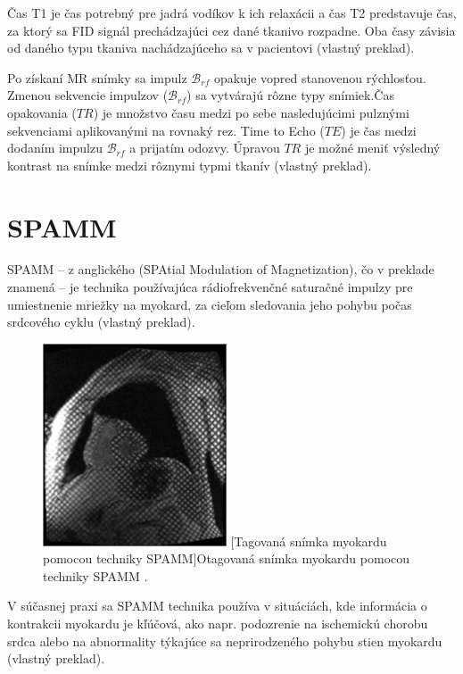 Čas T1 je čas potrebný pre jadrá vodíkov k ich relaxácii a čas T2 predstavuje čas, za ktorý sa FID signál prechádzajúci cez dané tkanivo rozpadne. \newline Oba časy závisia od daného typu tkaniva nachádzajúceho sa v pacientovi \cite{basic_principles_of_mri} (vlastný preklad).

Po získaní MR snímky sa impulz $\mathcal{B}_{rf}$ opakuje vopred stanovenou rýchlosťou. Zmenou sekvencie impulzov ($\mathcal{B}_{rf}$) sa vytvárajú rôzne typy snímiek.\newline Čas opakovania ($TR$) je množstvo času medzi po sebe nasledujúcimi pulznými sekvenciami aplikovanými na rovnaký rez. Time to Echo ($TE$) je čas medzi dodaním impulzu $\mathcal{B}_{rf}$ a prijatím odozvy. Úpravou $TR$ je možné meniť výsledný kontrast na snímke medzi rôznymi typmi tkanív \cite{basic_principles_of_mri} (vlastný preklad).

\section {SPAMM}
SPAMM -- z anglického (SPAtial Modulation of Magnetization), čo v preklade znamená  -- je technika používajúca rádiofrekvenčné saturačné impulzy pre umiestnenie mriežky na myokard, za cieľom sledovania jeho pohybu počas srdcového cyklu \cite{spamm_description} (vlastný preklad).

\begin {figure}[H]
        \centering
        \includegraphics[height=6cm]{media/heart/tagged_heart.png}
        \captionsetup{justification=centering}
        [Tagovaná snímka myokardu pomocou techniky SPAMM]{Otagovaná snímka myokardu pomocou techniky SPAMM \cite{spamm_description}.}
\end {figure}

V súčasnej praxi sa SPAMM technika používa v situáciách, kde informácia o kontrakcii myokardu je kľúčová, ako napr. podozrenie na ischemickú chorobu srdca alebo na abnormality týkajúce sa neprirodzeného pohybu stien myokardu \cite{spamm_description} (vlastný preklad).

